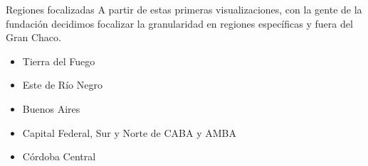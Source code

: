 \documentclass[xcolor=x11names]{beamer}
\begin{document}

\begin{frame}{Regiones focalizadas}
	A partir de estas primeras visualizaciones, con la gente de la fundación decidimos focalizar la granularidad en regiones específicas y fuera del Gran Chaco.
		\begin{itemize}
			\item Tierra del Fuego
			\item Este de Río Negro
			\item Buenos Aires
			\item Capital Federal, Sur y Norte de CABA y AMBA
			\item Córdoba Central
		\end{itemize}
\end{frame}
\end{document}
